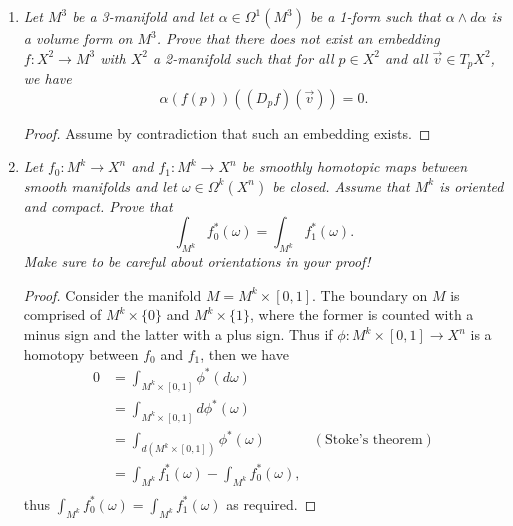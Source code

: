 \documentclass{article}
\begin{document}
\begin{enumerate}[label={\bf Q\arabic*:}]
\begin{proof}
      Let $v_1,\ldots,v_n$ be a basis of the tangent space $T_eG$. Then the
      $n$ vector fields $dL_g(v_1),\ldots,dL_g(v_n)\in T_gG$ are linearly
      independent at $g\in M$: First, note that each $dL_g(v_i)$ is a smooth
      vector field from the smoothness of the group operations. Now since
      $L_g$ is a diffeomorphism, $dL_g$ is an isomorphism. Then since
      $v_1,\ldots,v_n$ form a basis of $T_eG$, their images
      $dL_g(v_1),\ldots,dL_g(v_n)$ form a basis of $T_gG$. \\

      So the map $\phi:G\times \mathbb{R}^n\rightarrow TG$ defined by
      $\phi((g,V))=(g,dL_g)_e(V)$ is a smooth vector-bundle isomorphism,
      thus $TG\cong G\times\mathbb{R}^n$.
    \end{proof}

  \item \it Let $M^3$ be a 3-manifold and let $\alpha\in\Omega^1(M^3)$ be a
    1-form such that $\alpha\wedge d\alpha$ is a volume form on $M^3$.
    Prove that there does not exist an embedding $f:X^2\rightarrow M^3$
    with $X^2$ a 2-manifold such that for all $p\in X^2$ and all
    $\vec{v}\in T_pX^2$, we have
    \[\alpha(f(p))((D_pf)(\vec{v}))=0.\]

    \begin{proof}
      Assume by contradiction that such an embedding exists.
    \end{proof}

  \item \it Let $f_0:M^k\rightarrow X^n$ and $f_1:M^k\rightarrow X^n$ be
    smoothly homotopic maps between smooth manifolds and let
    $\omega\in\Omega^k(X^n)$ be closed. Assume that $M^k$ is oriented and
    compact. Prove that
    \[\int_{M^k} f_0^*(\omega)= \int_{M^k} f_1^*(\omega).\]
    Make sure to be careful about orientations in your proof!

    \begin{proof}
      Consider the manifold $M=M^k\times[0,1]$. The boundary on $M$
      is comprised of $M^k\times\{0\}$ and $M^k\times\{1\}$, where the
      former is counted with a minus sign and the latter with a plus sign.
      Thus if $\phi:M^k\times[0,1]\rightarrow X^n$ is a homotopy between
      $f_0$ and $f_1$, then we have
      \begin{align*}
        0 &=\int_{M^k\times[0,1]} \phi^*(d\omega) \\
        &=\int_{M^k\times[0,1]} d\phi^*(\omega) \\
        &=\int_{d(M^k\times[0,1])} \phi^*(\omega) &(\text{Stoke's theorem})
          \\
        &=\int_{M^k} f_1^*(\omega) - \int_{M^k} f_0^*(\omega), \\
      \end{align*}
      thus $\int_{M^k} f_0^*(\omega)= \int_{M^k} f_1^*(\omega)$ as
      required.
    \end{proof}
\end{enumerate}
\end{document}
